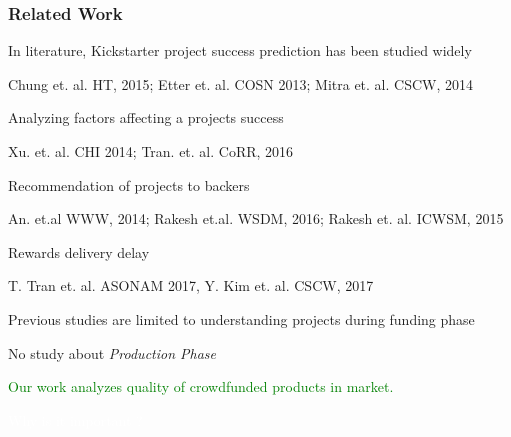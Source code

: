\documentclass[9pt]{beamer}
\newcommand{\SubItemBlue}[1]{
	{\setlength\itemindent{15pt} \item[\color{blue}\textbullet] #1}
}
\begin{document}
\begin{frame}
	\frametitle{Related Work}
	\begin{itemize}[label=\textcolor{blue}{\textbullet}]
		\item{In literature, Kickstarter project success prediction has been studied widely}
		\SubItemBlue{\small Chung et. al. HT, 2015; Etter et. al. COSN 2013; Mitra et. al. CSCW, 2014}
		\item{ {Analyzing factors affecting a projects success}}
		\SubItemBlue{\small {Xu. et. al. CHI 2014; Tran. et. al. CoRR, 2016}}
		\item{ {Recommendation of projects to backers  }}
		\SubItemBlue{\small {An. et.al WWW, 2014; Rakesh et.al. WSDM, 2016; Rakesh et. al. ICWSM, 2015}}
		\item{Rewards delivery delay}
		\SubItemBlue{\small T. Tran et. al. ASONAM 2017, Y. Kim et. al. CSCW, 2017}
		
		\item {Previous studies are limited to understanding projects during funding phase}
		\vspace{10pt}
		
	\end{itemize}
	\centering
	No study about \textit{Production Phase}
	
	\vspace{10pt}
	\centering
	\textcolor{green} {Our work analyzes quality of crowdfunded products in market.}
	
	\vspace{10pt}
	\centering
	\textcolor{white}{Why is it important ?}
	
\end{frame}
\end{document}

